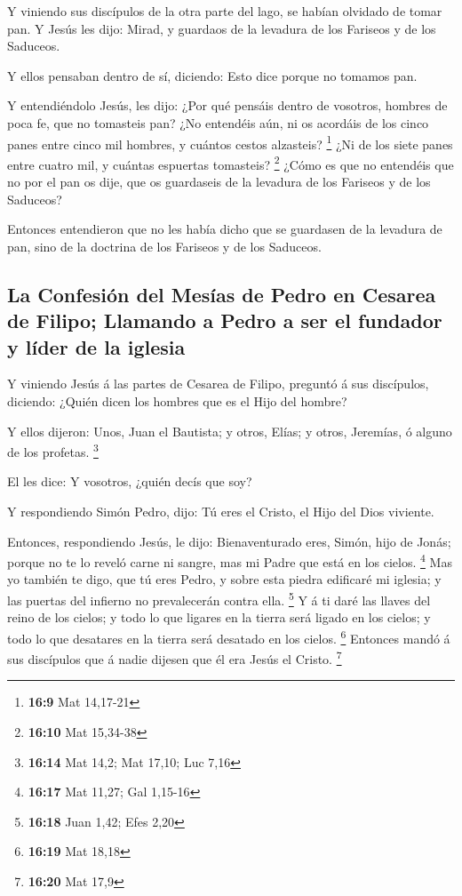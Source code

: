  Y viniendo sus discípulos de la otra parte del lago, se
habían olvidado de tomar pan.  Y Jesús les dijo: Mirad, y
guardaos de la levadura de los Fariseos y de los Saduceos.

 Y ellos pensaban dentro de sí, diciendo: Esto dice porque
no tomamos pan.

 Y entendiéndolo Jesús, les dijo: ¿Por qué pensáis dentro de
vosotros, hombres de poca fe, que no tomasteis pan?  ¿No
entendéis aún, ni os acordáis de los cinco panes entre cinco mil
hombres, y cuántos cestos alzasteis? \footnote{\textbf{16:9} Mat
  14,17-21}  ¿Ni de los siete panes entre cuatro mil, y
cuántas espuertas tomasteis? \footnote{\textbf{16:10} Mat 15,34-38}
 ¿Cómo es que no entendéis que no por el pan os dije, que
os guardaseis de la levadura de los Fariseos y de los Saduceos?

 Entonces entendieron que no les había dicho que se
guardasen de la levadura de pan, sino de la doctrina de los Fariseos y
de los Saduceos.

\hypertarget{la-confesiuxf3n-del-mesuxedas-de-pedro-en-cesarea-de-filipo-llamando-a-pedro-a-ser-el-fundador-y-luxedder-de-la-iglesia}{%
\subsection{La Confesión del Mesías de Pedro en Cesarea de Filipo;
Llamando a Pedro a ser el fundador y líder de la
iglesia}\label{la-confesiuxf3n-del-mesuxedas-de-pedro-en-cesarea-de-filipo-llamando-a-pedro-a-ser-el-fundador-y-luxedder-de-la-iglesia}}

 Y viniendo Jesús á las partes de Cesarea de Filipo,
preguntó á sus discípulos, diciendo: ¿Quién dicen los hombres que es el
Hijo del hombre?

 Y ellos dijeron: Unos, Juan el Bautista; y otros, Elías; y
otros, Jeremías, ó alguno de los profetas. \footnote{\textbf{16:14} Mat
  14,2; Mat 17,10; Luc 7,16}

 El les dice: Y vosotros, ¿quién decís que soy?

 Y respondiendo Simón Pedro, dijo: Tú eres el Cristo, el
Hijo del Dios viviente.

 Entonces, respondiendo Jesús, le dijo: Bienaventurado
eres, Simón, hijo de Jonás; porque no te lo reveló carne ni sangre, mas
mi Padre que está en los cielos. \footnote{\textbf{16:17} Mat 11,27; Gal
  1,15-16}  Mas yo también te digo, que tú eres Pedro, y
sobre esta piedra edificaré mi iglesia; y las puertas del infierno no
prevalecerán contra ella. \footnote{\textbf{16:18} Juan 1,42; Efes 2,20}
 Y á ti daré las llaves del reino de los cielos; y todo lo
que ligares en la tierra será ligado en los cielos; y todo lo que
desatares en la tierra será desatado en los cielos. \footnote{\textbf{16:19}
  Mat 18,18}  Entonces mandó á sus discípulos que á nadie
dijesen que él era Jesús el Cristo. \footnote{\textbf{16:20} Mat 17,9}

